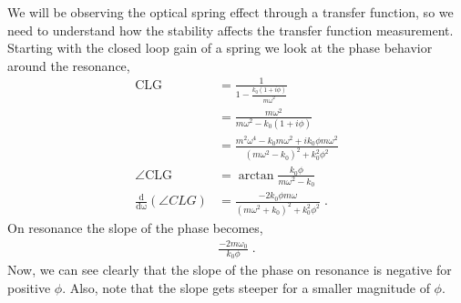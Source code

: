 

We will be observing the optical spring effect through a transfer function, so
we need to understand how the stability affects the transfer function measurement.
Starting with the closed loop gain of a spring we look at the phase behavior
around the resonance,
\begin{align}
\mathrm{CLG} &= \frac{1}{1-\frac{k_0(1+i\phi)}{m\omega^2}} \nonumber \\
  &= \frac{m\omega^2}{m\omega^2-k_0(1+i\phi)} \nonumber \\
  &= \frac{m^2\omega^4-k_0m\omega^2+ik_0\phi m\omega^2}{(m\omega^2-k_0)^2+k_0^2\phi^2} \\
\mathrm{\angle CLG} &= \arctan{\frac{k_0\phi}{m\omega^2-k_0}} \nonumber \\
\mathrm{\frac{d}{d\omega}}\left(\angle CLG\right) &= \frac{-2k_0\phi m\omega}{(m\omega^2+k_0)^2 + k_0^2\phi^2} \;.
\end{align}
On resonance the slope of the phase becomes,
\begin{align}
\frac{-2m\omega_0}{k_0\phi} \;.
\end{align}
Now, we can see clearly that the slope of the phase on resonance is
negative for positive $\phi$.
Also, note that the slope gets steeper for a smaller magnitude of $\phi$.


